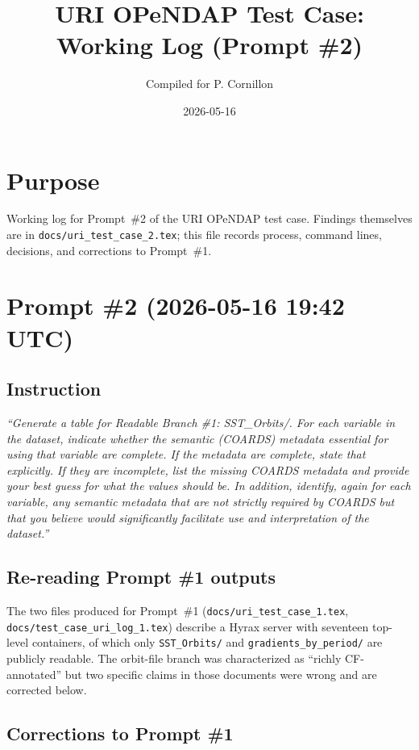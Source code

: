 \documentclass[11pt]{article}
\title{URI OPeNDAP Test Case: Working Log (Prompt \#2)}
\author{Compiled for P. Cornillon}
\date{2026-05-16}
\begin{document}
\maketitle

\section*{Purpose}

Working log for Prompt~\#2 of the URI OPeNDAP test case. Findings
themselves are in \texttt{docs/uri\_test\_case\_2.tex}; this file
records process, command lines, decisions, and corrections to
Prompt~\#1.

\section{Prompt \#2 (2026-05-16 19:42 UTC)}

\subsection{Instruction}

\emph{``Generate a table for Readable Branch \#1: SST\_Orbits/. For
each variable in the dataset, indicate whether the semantic
(COARDS) metadata essential for using that variable are complete.
If the metadata are complete, state that explicitly. If they are
incomplete, list the missing COARDS metadata and provide your best
guess for what the values should be. In addition, identify, again
for each variable, any semantic metadata that are not strictly
required by COARDS but that you believe would significantly
facilitate use and interpretation of the dataset.''}

\subsection{Re-reading Prompt \#1 outputs}

The two files produced for Prompt~\#1
(\texttt{docs/uri\_test\_case\_1.tex},
\texttt{docs/test\_case\_uri\_log\_1.tex}) describe a Hyrax server
with seventeen top-level containers, of which only
\texttt{SST\_Orbits/} and \texttt{gradients\_by\_period/} are
publicly readable. The orbit-file branch was characterized as
``richly CF-annotated'' but two specific claims in those documents
were wrong and are corrected below.

\subsection{Corrections to Prompt \#1}
\end{document}
